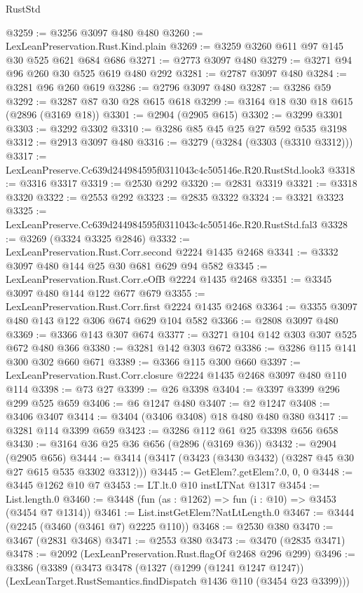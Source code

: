 \begin{lexlean}{RustStd}
\begin{coremodule}
@3259 := @3256 @3097 @480 @480
@3260 := LexLeanPreservation.Rust.Kind.plain
@3269 := @3259 @3260 @611 @97 @145 @30 @525 @621 @684 @686
@3271 := @2773 @3097 @480
@3279 := @3271 @94 @96 @260 @30 @525 @619 @480 @292
@3281 := @2787 @3097 @480
@3284 := @3281 @96 @260 @619
@3286 := @2796 @3097 @480
@3287 := @3286 @59
@3292 := @3287 @87 @30 @28 @615 @618
@3299 := @3164 @18 @30 @18 @615 (@2896 (@3169 @18))
@3301 := @2904 (@2905 @615)
@3302 := @3299 @3301
@3303 := @3292 @3302
@3310 := @3286 @85 @45 @25 @27 @592 @535 @3198
@3312 := @2913 @3097 @480
@3316 := @3279 (@3284 (@3303 (@3310 @3312)))
@3317 := LexLeanPreserve.Cc639d244984595f0311043c4c505146e.R20.RustStd.look3
@3318 := @3316 @3317
@3319 := @2530 @292
@3320 := @2831 @3319
@3321 := @3318 @3320
@3322 := @2553 @292
@3323 := @2835 @3322
@3324 := @3321 @3323
@3325 := LexLeanPreserve.Cc639d244984595f0311043c4c505146e.R20.RustStd.fal3
@3328 := @3269 (@3324 @3325 @2846)
@3332 := LexLeanPreservation.Rust.Corr.second @2224 @1435 @2468
@3341 := @3332 @3097 @480 @144 @25 @30 @681 @629 @94 @582
@3345 := LexLeanPreservation.Rust.Corr.eOfB @2224 @1435 @2468
@3351 := @3345 @3097 @480 @144 @122 @677 @679
@3355 := LexLeanPreservation.Rust.Corr.first @2224 @1435 @2468
@3364 := @3355 @3097 @480 @143 @122 @306 @674 @629 @104 @582
@3366 := @2808 @3097 @480
@3369 := @3366 @143 @307 @674
@3377 := @3271 @104 @142 @303 @307 @525 @672 @480 @366
@3380 := @3281 @142 @303 @672
@3386 := @3286 @115 @141 @300 @302 @660 @671
@3389 := @3366 @115 @300 @660
@3397 := LexLeanPreservation.Rust.Corr.closure @2224 @1435 @2468 @3097 @480 @110 @114
@3398 := @73 @27
@3399 := @26 @3398
@3404 := @3397 @3399 @296 @299 @525 @659
@3406 := @6 @1247 @480
@3407 := @2 @1247
@3408 := @3406 @3407
@3414 := @3404 (@3406 @3408) @18 @480 @480 @380
@3417 := @3281 @114 @3399 @659
@3423 := @3286 @112 @61 @25 @3398 @656 @658
@3430 := @3164 @36 @25 @36 @656 (@2896 (@3169 @36))
@3432 := @2904 (@2905 @656)
@3444 := @3414 (@3417 (@3423 (@3430 @3432) (@3287 @45 @30 @27 @615 @535 @3302 @3312)))
@3445 := GetElem?.getElem?.{0, 0, 0}
@3448 := @3445 @1262 @10 @7
@3453 := LT.lt.{0} @10 instLTNat @1317
@3454 := List.length.{0}
@3460 := @3448 (fun (as : @1262) => fun (i : @10) => @3453 (@3454 @7 @1314))
@3461 := List.instGetElem?NatLtLength.{0}
@3467 := @3444 (@2245 (@3460 (@3461 @7) @2225 @110))
@3468 := @2530 @380
@3470 := @3467 (@2831 @3468)
@3471 := @2553 @380
@3473 := @3470 (@2835 @3471)
@3478 := @2092 (LexLeanPreservation.Rust.flagOf @2468 @296 @299)
@3496 := @3386
    (@3389
      (@3473
        @3478
        (@1327
          (@1299 (@1241 @1247 @1247))
          (LexLeanTarget.RustSemantics.findDispatch @1436 @110 (@3454 @23 @3399)))

\end{coremodule}
\end{lexlean}
